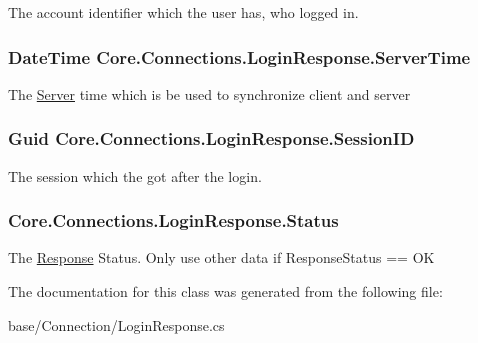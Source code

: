 The account identifier which the user has, who logged in. 

\hypertarget{classCore_1_1Connections_1_1LoginResponse_a1bb5d99f8fa2a5564fa2d7ba2d613fd0}{}
\subsubsection[{Server\+Time}]{\setlength{\rightskip}{0pt plus 5cm}Date\+Time Core.\+Connections.\+Login\+Response.\+Server\+Time}\label{classCore_1_1Connections_1_1LoginResponse_a1bb5d99f8fa2a5564fa2d7ba2d613fd0}


The \hyperlink{namespaceServer}{Server} time which is be used to synchronize client and server 

\hypertarget{classCore_1_1Connections_1_1LoginResponse_a0852c12c3db05b5f4093ee08f5aa4107}{}
\subsubsection[{Session\+I\+D}]{\setlength{\rightskip}{0pt plus 5cm}Guid Core.\+Connections.\+Login\+Response.\+Session\+I\+D}\label{classCore_1_1Connections_1_1LoginResponse_a0852c12c3db05b5f4093ee08f5aa4107}


The session which the got after the login. 

\hypertarget{classCore_1_1Connections_1_1LoginResponse_a07d5c565863a18dc114700d9420b2d5f}{}
\subsubsection[{Status}]{ Core.\+Connections.\+Login\+Response.\+Status}\label{classCore_1_1Connections_1_1LoginResponse_a07d5c565863a18dc114700d9420b2d5f}


The \hyperlink{classCore_1_1Connections_1_1Response}{Response} Status. Only use other data if Response\+Status == O\+K 



The documentation for this class was generated from the following file\+:\begin{DoxyCompactItemize}
\item 
base/\+Connection/Login\+Response.\+cs\end{DoxyCompactItemize}
